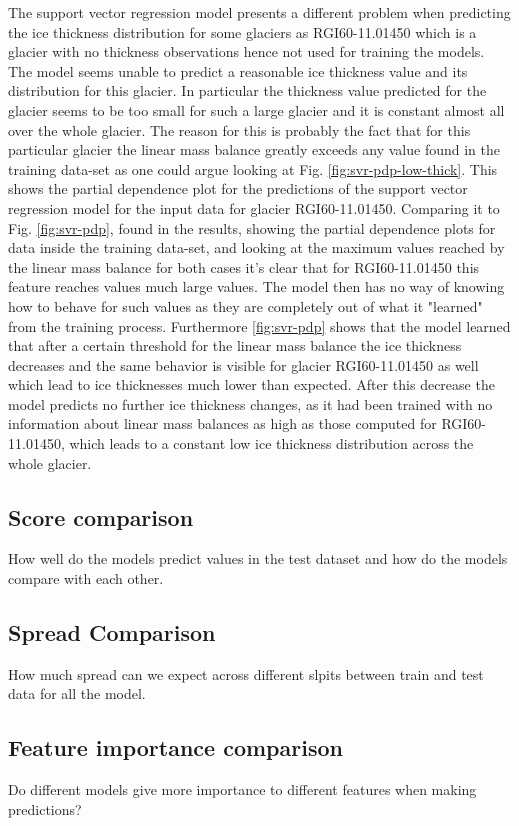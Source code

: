 The support vector regression model presents a different problem when predicting the ice thickness distribution for some glaciers as RGI60-11.01450 which is a glacier with no thickness observations hence not used for training the models. The model seems unable to predict a reasonable ice thickness value and its distribution for this glacier. In particular the thickness value predicted for the glacier seems to be too small for such a large glacier and it is constant almost all over the whole glacier. The reason for this is probably the fact that for this particular glacier the linear mass balance greatly exceeds any value found in the training data-set as one could argue looking at Fig. \ref{fig:svr-pdp-low-thick}. This shows the partial dependence plot for the predictions of the support vector regression model for the input data for glacier RGI60-11.01450. Comparing it to Fig. \ref{fig:svr-pdp}, found in the results, showing the partial dependence plots for data inside the training data-set, and looking at the maximum values reached by  the linear mass balance for both cases it's clear that for RGI60-11.01450 this feature reaches values much large values. The model then has no way of knowing how to behave for such values as they are completely out of what it "learned" from the training process. Furthermore \ref{fig:svr-pdp} shows that the model learned that after a certain threshold for the linear mass balance the ice thickness decreases and the same behavior is visible for glacier RGI60-11.01450 as well which lead to ice thicknesses much lower than expected. After this decrease the model predicts no further ice thickness changes, as it had been trained with no information about linear mass balances as high as those computed for RGI60-11.01450, which leads to a constant low ice thickness distribution across the whole glacier.

\subsection{Score comparison}
How well do the models predict values in the test dataset and how do the models compare with each other.

\subsection{Spread Comparison}
How much spread can we expect across different slpits between train and test data for all the model.

\subsection{Feature importance comparison}
Do different models give more importance to different features when making predictions?

